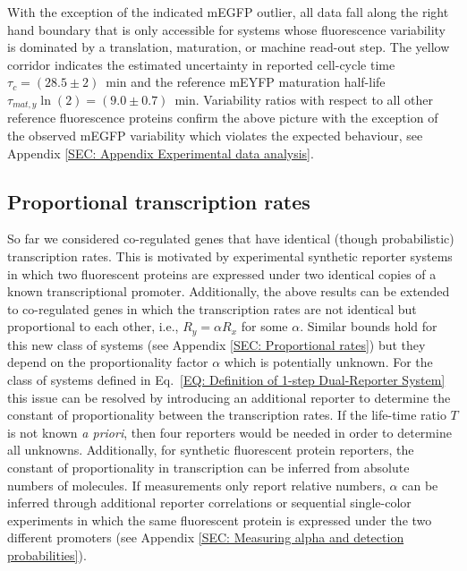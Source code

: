 \documentclass[%
 reprint,prx,
superscriptaddress,
%
%
%
%
%
%
%
%
%
 amsmath,amssymb,
 aps,
%
%
%
%
%
%
]{revtex4-2}
\begin{document}
\begin{figure*}[hbt!]
{{%
With the exception of the indicated mEGFP outlier, all data fall along the right hand boundary that is only accessible for systems whose fluorescence variability is dominated by a translation, maturation, or machine read-out step. The yellow corridor indicates the estimated uncertainty in reported cell-cycle time $\tau_c =(28.5\pm2)$~min and the reference mEYFP maturation half-life $\tau_{mat,y}\ln(2)  = (9.0\pm0.7)$~min. Variability ratios with respect to all other reference fluorescence proteins confirm the above picture with the exception of the observed mEGFP variability which violates the expected behaviour, see Appendix \ref{SEC: Appendix Experimental data analysis}.
%
%
%
}
}
\vspace{-1em}
\label{FIG: Concentrations (manuscript)}
\end{figure*} 

\vspace{-.5em}
\subsection{Proportional transcription rates}\vspace{-.75em}
So far we considered co-regulated genes that have identical (though probabilistic) transcription rates. This is motivated by experimental synthetic reporter systems in which two fluorescent proteins are expressed under two identical copies of a known transcriptional promoter. Additionally, the above results can be extended to co-regulated genes in which the transcription rates are not identical but proportional to each other, i.e., $R_{y} = \alpha R_{x}$ for some $\alpha$. Similar bounds hold for this new class of systems (see Appendix \ref{SEC: Proportional rates}) but they depend on the proportionality factor $\alpha$ which is potentially unknown. For the class of systems defined in Eq.~\eqref{EQ: Definition of 1-step Dual-Reporter System} this issue can be resolved by introducing an additional reporter to determine the constant of proportionality between the transcription rates. If the life-time ratio $T$ is not known \emph{a priori}, then four reporters would be needed in order to determine all unknowns. Additionally, for synthetic fluorescent protein reporters, the constant of proportionality in transcription can be inferred from absolute numbers of molecules. If measurements only report relative numbers, $\alpha$ can be inferred through additional reporter correlations or sequential single-color experiments in which the same fluorescent protein is expressed under the two different promoters (see Appendix \ref{SEC: Measuring alpha and detection probabilities}).
\end{document}
